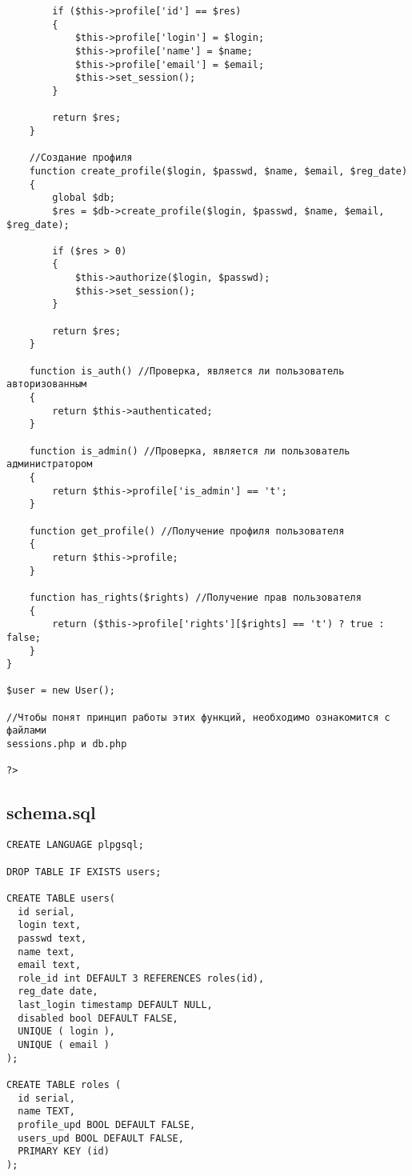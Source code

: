\documentclass[a4paper]{article}
\begin{document}
\begin{verbatim}
        if ($this->profile['id'] == $res)
        {
            $this->profile['login'] = $login;
            $this->profile['name'] = $name;
            $this->profile['email'] = $email;
            $this->set_session();
        }

        return $res;
    }

    //Создание профиля
    function create_profile($login, $passwd, $name, $email, $reg_date)
    {
        global $db;
        $res = $db->create_profile($login, $passwd, $name, $email, $reg_date);

        if ($res > 0)
        {
            $this->authorize($login, $passwd);
            $this->set_session();
        }

        return $res;
    }

    function is_auth() //Проверка, является ли пользователь авторизованным
    {
        return $this->authenticated;
    }

    function is_admin() //Проверка, является ли пользователь администратором
    {
        return $this->profile['is_admin'] == 't';
    }

    function get_profile() //Получение профиля пользователя
    {
        return $this->profile;
    }

    function has_rights($rights) //Получение прав пользователя
    {
        return ($this->profile['rights'][$rights] == 't') ? true : false;
    }
}

$user = new User();

//Чтобы понят принцип работы этих функций, необходимо ознакомится с файлами
sessions.php и db.php

?>
\end{verbatim}

\subsection{schema.sql}
\begin{verbatim}
CREATE LANGUAGE plpgsql;

DROP TABLE IF EXISTS users;

CREATE TABLE users(
  id serial,
  login text,
  passwd text,
  name text,
  email text,
  role_id int DEFAULT 3 REFERENCES roles(id),
  reg_date date,
  last_login timestamp DEFAULT NULL,
  disabled bool DEFAULT FALSE,
  UNIQUE ( login ),
  UNIQUE ( email )
);

CREATE TABLE roles (
  id serial,
  name TEXT,
  profile_upd BOOL DEFAULT FALSE,
  users_upd BOOL DEFAULT FALSE,
  PRIMARY KEY (id)
);
\end{verbatim}
\end{document}
